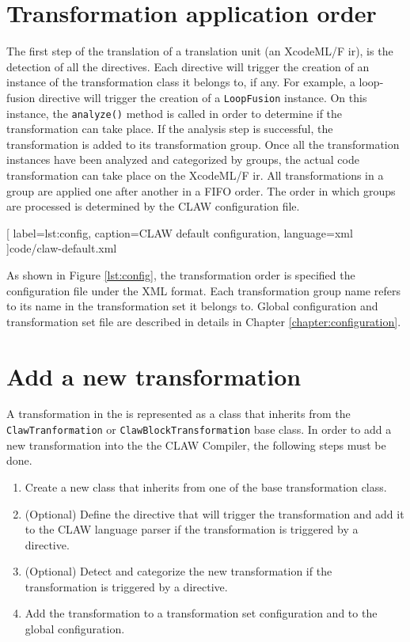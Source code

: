 \section{Transformation application order}
The first step of the translation of a translation unit (an XcodeML/F \gls{ir}),
is the detection of all the directives. Each directive will trigger the
creation of an instance of the transformation class it belongs to, if any.
For example, a loop-fusion directive will trigger the creation of a
\lstinline|LoopFusion| instance. On this instance, the \lstinline|analyze()|
method is called in order to determine if the transformation can take place.
If the analysis step is successful, the transformation is added to its
transformation group. Once all the transformation instances have been analyzed
and categorized by groups, the actual code transformation can take place on
the XcodeML/F \gls{ir}. All transformations in a group are applied one after
another in a FIFO order. The order in which groups are processed is determined
by the CLAW configuration file.


  [
    label=lst:config,
    caption=CLAW default configuration,
    language=xml
  ]{code/claw-default.xml}

As shown in Figure \ref{lst:config}, the transformation order is specified the
configuration file under the XML format.
Each transformation group name refers to its name in the transformation set it
belongs to. Global configuration and transformation set file are described in
details in Chapter \ref{chapter:configuration}.

\section{Add a new transformation}
\label{section:new_trans}
A transformation in the \clawfc is represented as a class that inherits from
the \lstinline|ClawTranformation| or \lstinline|ClawBlockTransformation|
base class. In order to add a new transformation into the the CLAW Compiler,
the following steps must be done.

\begin{enumerate}
\item Create a new class that inherits from one of the base transformation
      class.
\item (Optional) Define the directive that will trigger the transformation
      and add it to the CLAW language parser if the transformation is
      triggered by a directive.
\item (Optional) Detect and categorize the new transformation if the
      transformation is triggered by a directive.
\item Add the transformation to a transformation set configuration and to
      the global configuration.
\end{enumerate}

